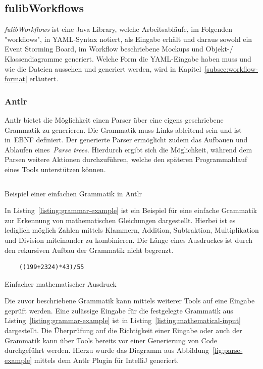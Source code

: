 \subsection{fulibWorkflows}\label{subsec:fulibworkflows}
\textit{fulibWorkflows} ist eine Java Library, welche Arbeitsabläufe, im Folgenden "workflows", in \ac{YAML}-Syntax notiert, als Eingabe erhält und daraus
sowohl ein Event Storming Board, im Workflow beschriebene Mockups und Objekt-/ Klassendiagramme generiert.
Welche Form die YAML-Eingabe haben muss und wie die Dateien aussehen und generiert werden, wird in Kapitel~\ref{subsec:workflow-format} erläutert.

\subsubsection{Antlr}\label{subsubsec:antlr}
\ac{Antlr} bietet die Möglichkeit einen Parser über eine eigens geschriebene Grammatik zu generieren.
Die Grammatik muss Links ableitend sein und ist in~\ac{EBNF} definiert.
Der generierte Parser ermöglicht zudem das Aufbauen und Ablaufen eines~\textit{Parse trees}.
Hierdurch ergibt sich die Möglichkeit, während dem Parsen weitere Aktionen durchzuführen, welche den späteren Programmablauf eines Tools unterstützen können.

\begin{listing}[!ht]
    \inputminted{antlr-java}{listings/2.2.1/AntlrExample.g4}
    \caption{Beispiel einer einfachen Grammatik in Antlr}
    \label{listing:grammar-example}
\end{listing}

In Listing~\ref{listing:grammar-example} ist ein Beispiel für eine einfache Grammatik zur Erkennung von mathematischen Gleichungen dargestellt.\cite{antlrOrg}
Hierbei ist es lediglich möglich Zahlen mittels Klammern, Addition, Subtraktion, Multiplikation und Division miteinander zu kombinieren.
Die Länge eines Ausdruckes ist durch den rekursiven Aufbau der Grammatik nicht begrenzt.

\begin{listing}[!ht]
    \begin{verbatim}
    ((199+2324)*43)/55

    \end{verbatim}
    \caption{Einfacher mathematischer Ausdruck}
    \label{listing:mathematical-input}
\end{listing}

Die zuvor beschriebene Grammatik kann mittels weiterer Tools auf eine Eingabe geprüft werden.
Eine zulässige Eingabe für die festgelegte Grammatik aus Listing~\ref{listing:grammar-example} ist in Listing~\ref{listing:mathematical-input} dargestellt.
Die Überprüfung auf die Richtigkeit einer Eingabe oder auch der Grammatik kann über Tools bereits vor einer Generierung von Code durchgeführt werden.
Hierzu wurde das Diagramm aus Abbildung~\ref{fig:parse-example} mittels dem Antlr Plugin für IntelliJ generiert.

